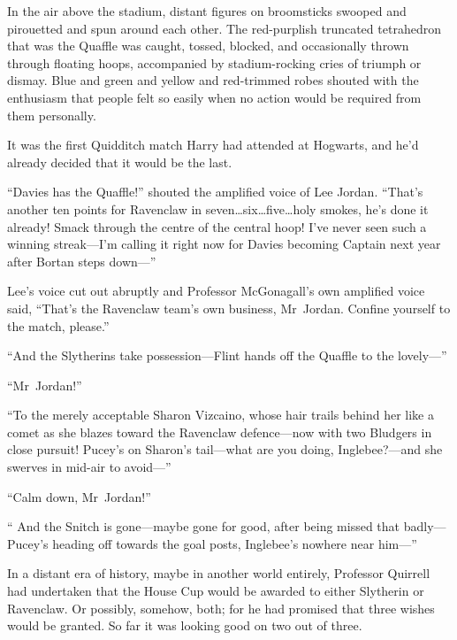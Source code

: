 \later

In the air above the stadium, distant figures on broomsticks swooped and pirouetted and spun around each other. The red-purplish truncated tetrahedron that was the Quaffle was caught, tossed, blocked, and occasionally thrown through floating hoops, accompanied by stadium-rocking cries of triumph or dismay. Blue and green and yellow and red-trimmed robes shouted with the enthusiasm that people felt so easily when no action would be required from them personally.

It was the first Quidditch match Harry had attended at Hogwarts, and he’d already decided that it would be the last.

“Davies has the Quaffle!” shouted the amplified voice of Lee Jordan.
“That’s another ten points for Ravenclaw in seven…six…five…holy smokes, he’s done it already! Smack through the centre of the central hoop! I’ve never seen such a winning streak—I’m calling it right now for Davies becoming Captain next year after Bortan steps down—”

Lee’s voice cut out abruptly and Professor McGonagall’s own amplified voice said,
“That’s the Ravenclaw team’s own business, Mr~Jordan. Confine yourself to the match, please.”

“And the Slytherins take possession—Flint hands off the Quaffle to the lovely—”

“Mr~Jordan!”

“To the merely acceptable Sharon Vizcaino, whose hair trails behind her like a comet as she blazes toward the Ravenclaw defence—now with two Bludgers in close pursuit! Pucey’s on Sharon’s tail—what are you doing, Inglebee?—and she swerves in mid-air to avoid—”

“Calm down, Mr~Jordan!”

“ And the Snitch is gone—maybe gone for good, after being missed that badly—Pucey’s heading off towards the goal posts, Inglebee’s nowhere near him—”

In a distant era of history, maybe in another world entirely, Professor Quirrell had undertaken that the House Cup would be awarded to either Slytherin or Ravenclaw. Or possibly, somehow, both; for he had promised that three wishes would be granted. So far it was looking good on two out of three.

